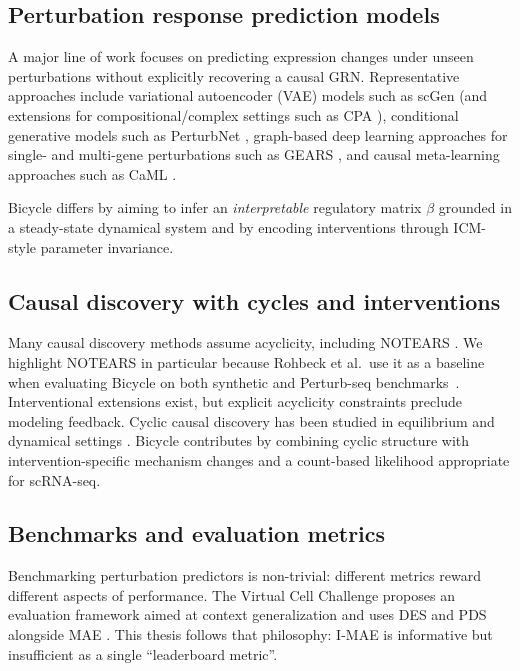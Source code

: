 \documentclass[12pt]{article}
\begin{document}
\subsection{Perturbation response prediction models}
A major line of work focuses on predicting expression changes under unseen perturbations without
explicitly recovering a causal GRN. Representative approaches include variational autoencoder (VAE) models such as scGen \cite{lotfollahi2019scgen}
(and extensions for compositional/complex settings such as CPA \cite{lotfollahi2023cpa}),
conditional generative models such as PerturbNet \cite{yu2025perturbnet},
graph-based deep learning approaches for single- and multi-gene perturbations such as GEARS \cite{roohani2024gears},
and causal meta-learning approaches such as CaML \cite{nilforoshan2023zeroshot}.

Bicycle differs by aiming to infer an \emph{interpretable} regulatory matrix \(\beta\) grounded in a
steady-state dynamical system and by encoding interventions through ICM-style parameter
invariance.

\subsection{Causal discovery with cycles and interventions}
Many causal discovery methods assume acyclicity, including NOTEARS \cite{zheng2018notears}. We highlight NOTEARS in particular because Rohbeck et al.\ use it as a baseline when evaluating Bicycle on both synthetic and Perturb-seq benchmarks~\cite{rohbeck2024bicycle}.
Interventional extensions exist, but explicit acyclicity constraints preclude modeling feedback.
Cyclic causal discovery has been studied in equilibrium and dynamical settings
\cite{mooij2013cyclic,bongers2021theoretical,sethuraman2025dccdconf}. Bicycle contributes by combining cyclic structure
with intervention-specific mechanism changes and a count-based likelihood appropriate for scRNA-seq.

\subsection{Benchmarks and evaluation metrics}
Benchmarking perturbation predictors is non-trivial: different metrics reward different aspects of
performance. The Virtual Cell Challenge proposes an evaluation framework aimed at context
generalization and uses DES and PDS alongside MAE \cite{virtualcellchallenge_eval}. This thesis follows
that philosophy: I-MAE is informative but insufficient as a single ``leaderboard metric''.
\end{document}
